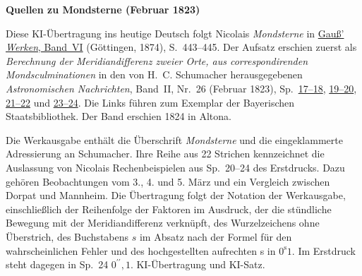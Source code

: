 \clearpage\thispagestyle{empty}
\begin{center}\textbf{Quellen zu Mondsterne (Februar 1823)}\end{center}
\noindent Diese KI-Übertragung ins heutige Deutsch folgt Nicolais \textit{Mondsterne} in \href{https://gdz.sub.uni-goettingen.de/id/PPN236007467}{Gauß’ \textit{Werken}, Band~VI} (Göttingen, 1874), S.~443--445. Der Aufsatz erschien zuerst als \textit{Berechnung der Meridiandifferenz zweier Orte, aus correspondirenden Mondsculminationen} in den von H.~C. Schumacher herausgegebenen \textit{Astronomischen Nachrichten}, Band~II, Nr.~26 (Februar 1823), Sp.~\href{https://api.digitale-sammlungen.de/iiif/image/v2/bsb10049427_00021/full/1800,/0/default.jpg}{17--18}, \href{https://api.digitale-sammlungen.de/iiif/image/v2/bsb10049427_00022/full/1800,/0/default.jpg}{19--20}, \href{https://api.digitale-sammlungen.de/iiif/image/v2/bsb10049427_00025/full/1800,/0/default.jpg}{21--22} und \href{https://api.digitale-sammlungen.de/iiif/image/v2/bsb10049427_00026/full/1800,/0/default.jpg}{23--24}. Die Links führen zum Exemplar der Bayerischen Staatsbibliothek. Der Band erschien 1824 in Altona.
\par\smallskip\noindent Die Werkausgabe enthält die Überschrift \textit{Mondsterne} und die eingeklammerte Adressierung an Schumacher. Ihre Reihe aus 22 Strichen kennzeichnet die Auslassung von Nicolais Rechenbeispielen aus Sp.~20--24 des Erstdrucks. Dazu gehören Beobachtungen vom 3., 4. und 5. März und ein Vergleich zwischen Dorpat und Mannheim. Die Übertragung folgt der Notation der Werkausgabe, einschließlich der Reihenfolge der Faktoren im Ausdruck, der die stündliche Bewegung mit der Meridiandifferenz verknüpft, des Wurzelzeichens ohne Überstrich, des Buchstabens $s$ im Absatz nach der Formel für den wahrscheinlichen Fehler und des hochgestellten aufrechten s in $0^{\mathrm{s}}1$. Im Erstdruck steht dagegen in Sp.~24 $0^{\prime\prime}{,}1$. KI-Übertragung und KI-Satz.
\clearpage
